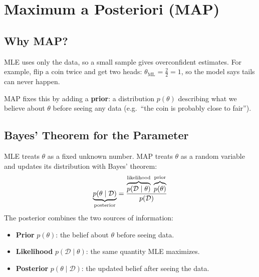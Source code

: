 \section*{Maximum a Posteriori (MAP)}

\subsection*{Why MAP?}
MLE uses only the data, so a small sample gives overconfident estimates. For example, flip a coin twice and get two heads: $\theta_{\text{ML}} = \tfrac{2}{2} = 1$, so the model says tails can never happen.

MAP fixes this by adding a \textbf{prior}: a distribution $p(\theta)$ describing what we believe about $\theta$ before seeing any data (e.g.\ ``the coin is probably close to fair'').

\subsection*{Bayes' Theorem for the Parameter}
\begin{keeptogether}
MLE treats $\theta$ as a fixed unknown number. MAP treats $\theta$ as a random variable and updates its distribution with Bayes' theorem:
\[
\underbrace{p(\theta \mid \mathcal{D})}_{\makebox[0pt]{\scriptsize posterior}}
= \frac{\overbrace{p(\mathcal{D} \mid \theta)}^{\makebox[0pt]{\scriptsize likelihood}}\;\overbrace{p(\theta)}^{\makebox[0pt]{\scriptsize prior}}}{p(\mathcal{D})}
\]
The posterior combines the two sources of information:
\begin{itemize}
  \item \textbf{Prior} $p(\theta)$: the belief about $\theta$ before seeing data.
  \item \textbf{Likelihood} $p(\mathcal{D} \mid \theta)$: the same quantity MLE maximizes.
  \item \textbf{Posterior} $p(\theta \mid \mathcal{D})$: the updated belief after seeing the data.
\end{itemize}
\end{keeptogether}

